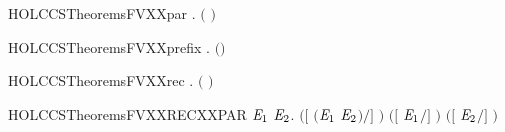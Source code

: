 \newcommand{\HOLCCSTheoremsFVXXnil}{\UseVerbatim{HOLCCSTheoremsFVXXnil}}
\begin{SaveVerbatim}{HOLCCSTheoremsFVXXpar}
\HOLTokenTurnstile{} \HOLSymConst{\HOLTokenForall{}} .  \ensuremath{(} \HOLSymConst{\ensuremath{\mid}} \ensuremath{)} \HOLSymConst{\ensuremath{=}}   \HOLConst{\HOLTokenUnion{}}  
\end{SaveVerbatim}
\newcommand{\HOLCCSTheoremsFVXXpar}{\UseVerbatim{HOLCCSTheoremsFVXXpar}}
\begin{SaveVerbatim}{HOLCCSTheoremsFVXXprefix}
\HOLTokenTurnstile{} \HOLSymConst{\HOLTokenForall{}} .  \ensuremath{(}\HOLSymConst{\ensuremath{\ldotp}}\ensuremath{)} \HOLSymConst{\ensuremath{=}}  
\end{SaveVerbatim}
\newcommand{\HOLCCSTheoremsFVXXprefix}{\UseVerbatim{HOLCCSTheoremsFVXXprefix}}
\begin{SaveVerbatim}{HOLCCSTheoremsFVXXrec}
\HOLTokenTurnstile{} \HOLSymConst{\HOLTokenForall{}} .  \ensuremath{(}  \ensuremath{)} \HOLSymConst{\ensuremath{=}}    
\end{SaveVerbatim}
\newcommand{\HOLCCSTheoremsFVXXrec}{\UseVerbatim{HOLCCSTheoremsFVXXrec}}
\begin{SaveVerbatim}{HOLCCSTheoremsFVXXRECXXPAR}
\HOLTokenTurnstile{} \HOLSymConst{\HOLTokenForall{}}  \ensuremath{\HOLBoundVar{E}\sb{\mathrm{1}}} \ensuremath{\HOLBoundVar{E}\sb{\mathrm{2}}}.
        \ensuremath{(}\ensuremath{[}  \ensuremath{(}\ensuremath{\HOLBoundVar{E}\sb{\mathrm{1}}} \HOLSymConst{\ensuremath{\mid}} \ensuremath{\HOLBoundVar{E}\sb{\mathrm{2}}}\ensuremath{)}\ensuremath{/}\ensuremath{]} \ensuremath{)} \HOLSymConst{\ensuremath{=}}
        \ensuremath{(}\ensuremath{[}  \ensuremath{\HOLBoundVar{E}\sb{\mathrm{1}}}\ensuremath{/}\ensuremath{]} \ensuremath{)} \HOLConst{\HOLTokenUnion{}}  \ensuremath{(}\ensuremath{[}  \ensuremath{\HOLBoundVar{E}\sb{\mathrm{2}}}\ensuremath{/}\ensuremath{]} \ensuremath{)}
\end{SaveVerbatim}
